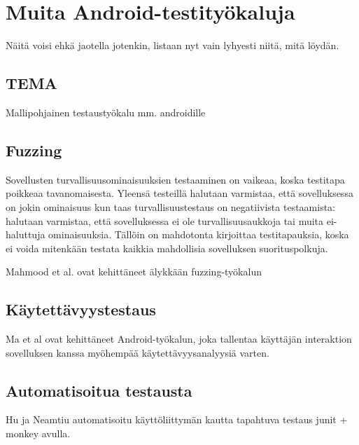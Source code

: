 \section{Muita Android-testityökaluja}

Näitä voisi ehkä jaotella jotenkin, listaan nyt vain lyhyesti niitä, mitä löydän.

\subsection{TEMA}

Mallipohjainen testaustyökalu mm. androidille \cite{takalaetal11}

\subsection{Fuzzing}

Sovellusten turvallisuusominaisuuksien testaaminen on vaikeaa, koska testitapa poikkeaa tavanomaisesta. Yleensä testeillä halutaan varmistaa, että sovelluksessa on jokin ominaisuus kun taas turvallisuustestaus on negatiivista testaamista: halutaan varmistaa, että sovelluksessa ei ole turvallisuusaukkoja tai muita ei-haluttuja ominaisuuksia. Tällöin on mahdotonta kirjoittaa testitapauksia, koska ei voida mitenkään testata kaikkia mahdollisia sovelluksen suorituspolkuja.\cite{mahmoodetal12}

Mahmood et al. ovat kehittäneet älykkään fuzzing-työkalun

\subsection{Käytettävyystestaus}

Ma et al \cite{maetal11} ovat kehittäneet Android-työkalun, joka tallentaa käyttäjän interaktion sovelluksen kanssa myöhempää käytettävyysanalyysiä varten.

\subsection{Automatisoitua testausta}

Hu ja Neamtiu \cite{hu10} automatisoitu käyttöliittymän kautta tapahtuva testaus junit + monkey avulla.